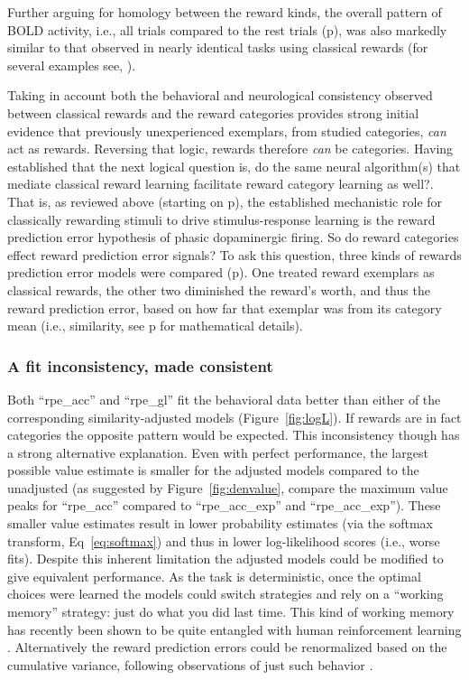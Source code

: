 Further arguing for homology between the reward kinds, the overall pattern of BOLD activity, i.e., all trials compared to the rest trials (p\pageref{sub:blob}), was also markedly similar to that observed in nearly identical tasks using classical rewards (for several examples see, ).

Taking in account both the behavioral and neurological consistency observed between classical rewards and the reward categories provides strong initial evidence that previously unexperienced exemplars, from studied categories, \emph{can} act as rewards.  Reversing that logic, rewards therefore \emph{can} be categories.  Having established that the next logical question is, do the same neural algorithm(s) that mediate classical reward learning facilitate reward category learning as well?.  That is, as reviewed above (starting on p\pageref{subsub:expectations}), the established mechanistic role for classically rewarding stimuli to drive stimulus-response learning is the reward prediction error hypothesis of phasic dopaminergic firing.  So do reward categories effect reward prediction error signals?  To ask this question, three kinds of rewards prediction error models were compared (p\pageref{sub:threemodels}).  One treated reward exemplars as classical rewards, the other two diminished the reward's worth, and thus the reward prediction error, based on how far that exemplar was from its category mean (i.e., similarity, see p\pageref{subsub:incantations} for mathematical details).

\subsubsection{A fit inconsistency, made consistent}
\label{subsub:inconsistency}
Both ``rpe\_acc'' and ``rpe\_gl'' fit the behavioral data better than either of the corresponding similarity-adjusted models (Figure~\ref{fig:logL}).  If rewards are in fact categories the opposite pattern would be expected.  This inconsistency though has a strong alternative explanation.  Even with perfect performance, the largest possible value estimate is smaller for the adjusted models compared to the unadjusted (as suggested by Figure~\ref{fig:denvalue}, compare the maximum value peaks for ``rpe\_acc'' compared to ``rpe\_acc\_exp'' and ``rpe\_acc\_exp'').  These smaller value estimates result in lower probability estimates (via the softmax transform, Eq~\ref{eq:softmax}) and thus in lower log-likelihood scores (i.e., worse fits).  Despite this inherent limitation the adjusted models could be modified to give equivalent performance.  As the task is deterministic, once the optimal choices were learned the models could switch strategies and rely on a ``working memory'' strategy: just do what you did last time.  This kind of working memory has recently been shown to be quite entangled with human reinforcement learning \cite{Collins:2012p9779}.  Alternatively the reward prediction errors could be renormalized based on the cumulative variance, following observations of just such behavior \cite{Tobler:2005p6373}.

